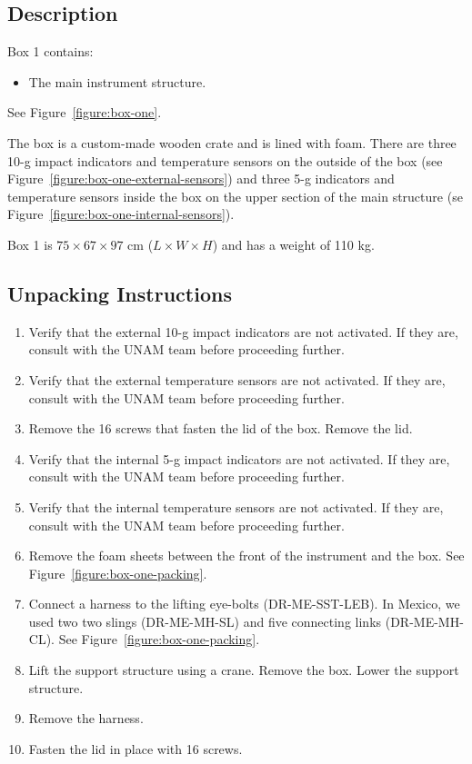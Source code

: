 \documentclass{article}
\begin{document}
\subsection{Description}

Box 1 contains:

\begin{itemize}
    \item The main instrument structure.
\end{itemize}

See Figure~\ref{figure:box-one}.

The box is a custom-made wooden crate and is lined with foam. There are three 10-g impact indicators and temperature sensors on the outside of the box (see Figure~\ref{figure:box-one-external-sensors}) and three 5-g indicators and temperature sensors inside the box on the upper section of the main structure (se Figure~\ref{figure:box-one-internal-sensors}).

Box 1 is $75 \times 67 \times 97$ cm ($L \times W \times H$) and has a weight of 110 kg.

\subsection{Unpacking Instructions}

\begin{enumerate}
\item Verify that the external 10-g impact indicators are not activated. If they are, consult with the UNAM team before proceeding further.
\item Verify that the external temperature sensors are not activated. If they are, consult with the UNAM team before proceeding further.
\item Remove the 16 screws that fasten the lid of the box. Remove the lid.
\item Verify that the internal 5-g impact indicators are not activated. If they are, consult with the UNAM team before proceeding further.
\item Verify that the internal temperature sensors are not activated. If they are, consult with the UNAM team before proceeding further.
\item Remove the foam sheets between the front of the instrument and the box. See Figure~\ref{figure:box-one-packing}.
\item Connect a harness to the lifting eye-bolts  (DR-ME-SST-LEB). In Mexico, we used two two slings (DR-ME-MH-SL) and 
five connecting links (DR-ME-MH-CL). See Figure~\ref{figure:box-one-packing}.
\item Lift the support structure using a crane. Remove the box. Lower the support structure.
\item Remove the harness.
\item Fasten the lid in place with 16 screws.
\end{enumerate}
\end{document}
